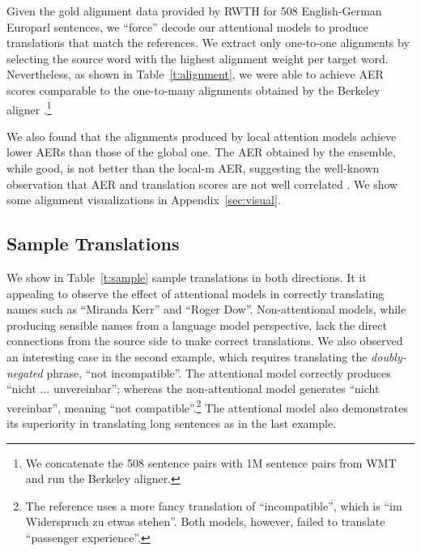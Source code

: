 Given the gold alignment data provided by RWTH for 508 English-German
Europarl sentences, we ``force'' decode our attentional models to
produce translations that match the references. We extract only one-to-one
alignments by selecting the source word with the highest alignment
weight per target word. Nevertheless, as shown in Table~\ref{t:alignment}, we were able to achieve AER scores
comparable to the one-to-many alignments obtained by the Berkeley aligner
\cite{liang06alignment}.\footnote{We concatenate the 508 sentence pairs with 1M
sentence pairs from WMT and run the Berkeley aligner.}

We also found that the alignments produced by local attention models achieve
lower AERs than those of the global one. The AER obtained by the ensemble, while
good, is not better than the local-m AER, suggesting the well-known
observation that AER and translation scores are not well correlated \cite{fraser07}.
We show some alignment visualizations in Appendix~\ref{sec:visual}.

\subsection{Sample Translations}
\label{sec:sample}
We show in Table~\ref{t:sample} sample translations in both directions. It it
appealing to observe the effect of attentional models in correctly translating
names such as ``Miranda Kerr'' and ``Roger Dow''. Non-attentional models, while producing sensible names from a language
model perspective, lack the direct connections from the source side to make
correct translations. %
We also observed an interesting case in the second
example, which requires translating the {\it doubly-negated} phrase, ``not incompatible''.
The attentional model correctly produces ``nicht $\dots$ unvereinbar'';
whereas the non-attentional model generates ``nicht vereinbar'', meaning
``not compatible''.\footnote{The reference uses a more fancy translation of
``incompatible'', which is ``im Widerspruch zu etwas stehen''. Both models, however, failed to translate ``passenger
experience''.} The attentional
model also demonstrates its superiority in translating long sentences as in
the last example.


